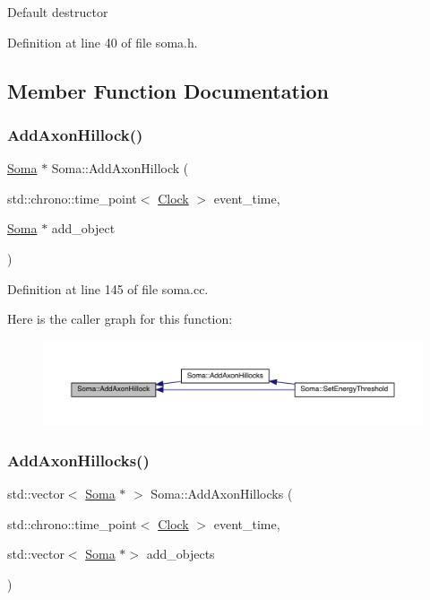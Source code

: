 Default destructor 

Definition at line 40 of file soma.\+h.



\subsection{Member Function Documentation}
\mbox{\label{class_soma_a02e0e4656099531b35ab56ad1f7c945a}} 
\subsubsection{\texorpdfstring{Add\+Axon\+Hillock()}{AddAxonHillock()}}
{\footnotesize\ttfamily \hyperlink{class_soma}{Soma} $\ast$ Soma\+::\+Add\+Axon\+Hillock (\begin{DoxyParamCaption}\item[{std\+::chrono\+::time\+\_\+point$<$ \hyperlink{universe_8h_a0ef8d951d1ca5ab3cfaf7ab4c7a6fd80}{Clock} $>$}]{event\+\_\+time,  }\item[{\hyperlink{class_soma}{Soma} $\ast$}]{add\+\_\+object }\end{DoxyParamCaption})}



Definition at line 145 of file soma.\+cc.

Here is the caller graph for this function\+:
\nopagebreak
\begin{figure}[H]
\begin{center}
\leavevmode
\includegraphics[width=350pt]{class_soma_a02e0e4656099531b35ab56ad1f7c945a_icgraph}
\end{center}
\end{figure}
\mbox{\label{class_soma_a0fbede6e06b8e24a2cf22878c2f49165}} 
\subsubsection{\texorpdfstring{Add\+Axon\+Hillocks()}{AddAxonHillocks()}}
{\footnotesize\ttfamily std\+::vector$<$ \hyperlink{class_soma}{Soma} $\ast$ $>$ Soma\+::\+Add\+Axon\+Hillocks (\begin{DoxyParamCaption}\item[{std\+::chrono\+::time\+\_\+point$<$ \hyperlink{universe_8h_a0ef8d951d1ca5ab3cfaf7ab4c7a6fd80}{Clock} $>$}]{event\+\_\+time,  }\item[{std\+::vector$<$ \hyperlink{class_soma}{Soma} $\ast$$>$}]{add\+\_\+objects }\end{DoxyParamCaption})}



